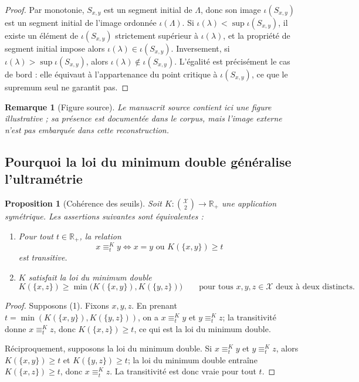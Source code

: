 \documentclass[11pt,a4paper,openany]{book}
\newtheorem{proposition}[definition]{Proposition}
\newtheorem{remark}[definition]{Remarque}
\begin{document}
\begin{proof}
Par monotonie, \(S_{x,y}\) est un segment initial de \(\Lambda\), donc son image \(\iota(S_{x,y})\) est un segment initial de l'image ordonnée \(\iota(\Lambda)\). Si \(\iota(\lambda)<\sup\iota(S_{x,y})\), il existe un élément de \(\iota(S_{x,y})\) strictement supérieur à \(\iota(\lambda)\), et la propriété de segment initial impose alors \(\iota(\lambda)\in\iota(S_{x,y})\). Inversement, si \(\iota(\lambda)>\sup\iota(S_{x,y})\), alors \(\iota(\lambda)\notin\iota(S_{x,y})\). L'égalité est précisément le cas de bord : elle équivaut à l'appartenance du point critique à \(\iota(S_{x,y})\), ce que le supremum seul ne garantit pas.
\end{proof}

\begin{remark}[Figure source]
Le manuscrit source contient ici une figure illustrative ; sa présence est documentée dans le corpus, mais l'image externe n'est pas embarquée dans cette reconstruction.
\end{remark}

\subsection{Pourquoi la loi du minimum double généralise l'ultramétrie}

\begin{proposition}[Cohérence des seuils]
Soit \(K:\binom{\mathcal X}{2}\to\mathbb R_+\) une application symétrique. Les assertions suivantes sont équivalentes :
\begin{enumerate}[label=\arabic*.]
\item Pour tout \(t\in\mathbb R_+\), la relation
\[
x\equiv_t^K y \Longleftrightarrow x=y \text{ ou } K(\{x,y\})\ge t
\]
est transitive.
\item \(K\) satisfait la loi du minimum double
\[
K(\{x,z\})\ge \min\bigl(K(\{x,y\}),K(\{y,z\})\bigr)
\qquad
\text{pour tous }x,y,z\in\mathcal X\text{ deux à deux distincts}.
\]
\end{enumerate}
\end{proposition}

\begin{proof}
Supposons (1). Fixons \(x,y,z\). En prenant \(t=\min(K(\{x,y\}),K(\{y,z\}))\), on a \(x\equiv_t^K y\) et \(y\equiv_t^K z\); la transitivité donne \(x\equiv_t^K z\), donc \(K(\{x,z\})\ge t\), ce qui est la loi du minimum double.

Réciproquement, supposons la loi du minimum double. Si \(x\equiv_t^K y\) et \(y\equiv_t^K z\), alors \(K(\{x,y\})\ge t\) et \(K(\{y,z\})\ge t\); la loi du minimum double entraîne \(K(\{x,z\})\ge t\), donc \(x\equiv_t^K z\). La transitivité est donc vraie pour tout \(t\).
\end{proof}
\end{document}
